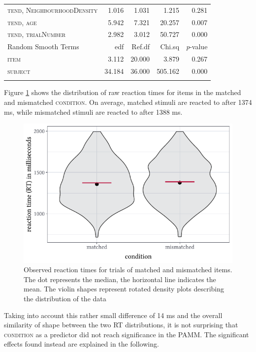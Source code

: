 \begin{table}
\begin{tabular}{lrrrr}
\textsc{tend,
  NeighbourhoodDensity} & 1.016    & 1.031  & 1.215    & 0.281             \\
\textsc{tend,
  age}                  & 5.942    & 7.321  & 20.257   & 0.007             \\
\textsc{tend,
  trialNumber}          & 2.982    & 3.012  & 50.727   & 0.000             \\ 
\midrule
Random Smooth Terms          & edf      & Ref.df & Chi.sq   & \textit{p}-value  \\ 
\midrule
\textsc{item}                         & 3.112    & 20.000 & 3.879    & 0.267             \\
\textsc{subject}                      & 34.184   & 36.000 & 505.162  & 0.000             \\
\lspbottomrule
\end{tabular}
\end{table}

Figure \ref{fig:7_3} shows the distribution of raw reaction times for items in the matched and mismatched \textsc{condition}. On average, matched stimuli are reacted to after 1374 ms, while mismatched stimuli are reacted to after 1388 ms. 

\begin{figure}
    \centering
    \includegraphics[]{figures/fig7.3.pdf}
    \caption{Observed reaction times for trials of matched and mismatched items. The dot represents the median, the horizontal line indicates the mean. The violin shapes represent rotated density plots describing the distribution of the data}
    \label{fig:7_3}
\end{figure}

Taking into account this rather small difference of 14 ms and the overall similarity of shape between the two RT distributions, it is not surprising that \textsc{condition} as a predictor did not reach significance in the PAMM. The significant effects found instead are explained in the following.

